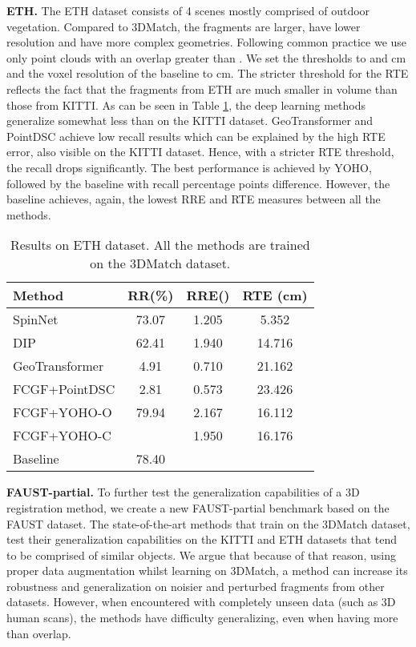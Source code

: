 \documentclass{bmvc2k}
\begin{document}
\textbf{ETH.} The ETH dataset \cite{ETH} consists of 4 scenes mostly comprised of outdoor vegetation. Compared to 3DMatch, the fragments are larger, have lower resolution and have more complex geometries. Following common practice \cite{the-perfect-match, DIP, SpinNet} we use only point clouds with an overlap greater than . We set the thresholds to  and cm and the voxel resolution of the baseline to cm. The stricter threshold for the RTE reflects the fact that the fragments from ETH are much smaller in volume than those from KITTI.
As can be seen in Table \ref{tab:ETH-results}, the deep learning methods generalize somewhat less than on the KITTI dataset. GeoTransformer and PointDSC achieve low recall results which can be explained by the high RTE error, also visible on the KITTI dataset. Hence, with a stricter RTE threshold, the recall drops significantly. The best performance is achieved by YOHO, followed by the baseline with  recall percentage points difference. However, the baseline achieves, again, the lowest RRE and RTE measures between all the methods.

\begin{table}[h!]
\scriptsize
\begin{center}
\begin{tabular}{l|c|c|c}
\hline
Method      & RR(\%) & RRE() & RTE (cm) \\
\hline
SpinNet \cite{SpinNet} & 73.07 & 1.205 & 5.352    \\
DIP \cite{DIP} & 62.41 & 1.940 & 14.716    \\
GeoTransformer \cite{geometric-transformer-for-fast-registration} & 4.91 & 0.710  &  21.162    \\
FCGF+PointDSC \cite{PointDSC} &  2.81  &  0.573 &  23.426    \\
FCGF+YOHO-O \cite{YOHO} & 79.94 &  2.167  &  16.112    \\
FCGF+YOHO-C \cite{YOHO} &  & 1.950  &  16.176    \\
\hline
Baseline    &   78.40    &     &   \\
\hline
\end{tabular}
\caption{Results on ETH dataset. All the methods are trained on the 3DMatch dataset.}
\label{tab:ETH-results}
\end{center}
\end{table}
 


\textbf{FAUST-partial.} To further test the generalization capabilities of a 3D registration method, we create a new FAUST-partial benchmark based on the FAUST \cite{FAUST} dataset. The state-of-the-art methods that train on the 3DMatch dataset, test their generalization capabilities \cite{SpinNet,DIP,geometric-transformer-for-fast-registration,pcam-product-of-cross-attention-matrices,PointDSC,the-perfect-match} on the KITTI \cite{KITTI} and ETH \cite{ETH} datasets that tend to be comprised of similar objects. We argue that because of that reason, using proper data augmentation whilst learning on 3DMatch, a method can increase its robustness and generalization on noisier and perturbed fragments from other datasets. However, when encountered with completely unseen data (such as 3D human scans), the methods have difficulty generalizing, even when having more than  overlap.
\end{document}
